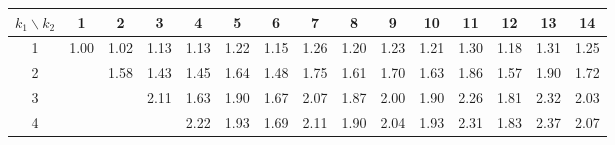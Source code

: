 \documentclass[a4paper, 11pt, ngerman]{article}
\theoremstyle{definition}
\theoremstyle{plain}
\theoremstyle{remark}
\begin{document}
\begin{figure}
    \vspace{0.2em}

    \begin{tabular}{c|cccccccccccccc}
        $k_1 \backslash k_2$ & 1                                & 2                                & 3                                & 4                                & 5                                & 6                                & 7                                & 8                                & 9                                & 10                               & 11                               & 12                               & 13                               & 14                               \\
        \hline
        1                    & \textcolor[HTML]{ 0020ff }{1.00} & \textcolor[HTML]{ 0120fd }{1.02} & \textcolor[HTML]{ 0920f5 }{1.13} & \textcolor[HTML]{ 0a20f4 }{1.13} & \textcolor[HTML]{ 1020ee }{1.22} & \textcolor[HTML]{ 0b20f3 }{1.15} & \textcolor[HTML]{ 1320eb }{1.26} & \textcolor[HTML]{ 0f20ef }{1.20} & \textcolor[HTML]{ 1120ed }{1.23} & \textcolor[HTML]{ 0f20ef }{1.21} & \textcolor[HTML]{ 1620e8 }{1.30} & \textcolor[HTML]{ 0d20f1 }{1.18} & \textcolor[HTML]{ 1720e7 }{1.31} & \textcolor[HTML]{ 1220ec }{1.25} \\
        2                    &                                  & \textcolor[HTML]{ 2b20d3 }{1.58} & \textcolor[HTML]{ 2020de }{1.43} & \textcolor[HTML]{ 2120dd }{1.45} & \textcolor[HTML]{ 3020ce }{1.64} & \textcolor[HTML]{ 2320db }{1.48} & \textcolor[HTML]{ 3820c6 }{1.75} & \textcolor[HTML]{ 2d20d1 }{1.61} & \textcolor[HTML]{ 3420ca }{1.70} & \textcolor[HTML]{ 2f20cf }{1.63} & \textcolor[HTML]{ 4020be }{1.86} & \textcolor[HTML]{ 2a20d4 }{1.57} & \textcolor[HTML]{ 4220bc }{1.90} & \textcolor[HTML]{ 3520c9 }{1.72} \\
        3                    &                                  &                                  & \textcolor[HTML]{ 5220ac }{2.11} & \textcolor[HTML]{ 2f20cf }{1.63} & \textcolor[HTML]{ 4320bb }{1.90} & \textcolor[HTML]{ 3220cc }{1.67} & \textcolor[HTML]{ 5020ae }{2.07} & \textcolor[HTML]{ 4120bd }{1.87} & \textcolor[HTML]{ 4a20b4 }{2.00} & \textcolor[HTML]{ 4320bb }{1.90} & \textcolor[HTML]{ 5e20a0 }{2.26} & \textcolor[HTML]{ 3c20c2 }{1.81} & \textcolor[HTML]{ 62209c }{2.32} & \textcolor[HTML]{ 4d20b1 }{2.03} \\
        4                    &                                  &                                  &                                  & \textcolor[HTML]{ 5a20a4 }{2.22} & \textcolor[HTML]{ 4520b9 }{1.93} & \textcolor[HTML]{ 3320cb }{1.69} & \textcolor[HTML]{ 5320ab }{2.11} & \textcolor[HTML]{ 4320bb }{1.90} & \textcolor[HTML]{ 4d20b1 }{2.04} & \textcolor[HTML]{ 4520b9 }{1.93} & \textcolor[HTML]{ 61209d }{2.31} & \textcolor[HTML]{ 3e20c0 }{1.83} & \textcolor[HTML]{ 662098 }{2.37} & \textcolor[HTML]{ 4f20af }{2.07} \\

\end{tabular}
\end{figure}
\end{document}
